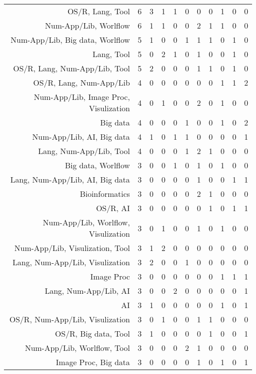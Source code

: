 {\begin{landscape}
\begin{longtable}[htb]{r|c|c|c|c|c|c|c|c|c|c}
{OS/R, Lang, Tool} & 6 & 3 & 1 & 1 & 0 & 0 & 0 & 1 & 0 & 0 \\%
{Num-App/Lib, Worlflow} & 6 & 1 & 1 & 0 & 0 & 2 & 1 & 1 & 0 & 0 \\%
{Num-App/Lib, Big data, Worlflow} & 5 & 1 & 0 & 0 & 1 & 1 & 1 & 0 & 1 & 0 \\%
{Lang, Tool} & 5 & 0 & 2 & 1 & 0 & 1 & 0 & 0 & 1 & 0 \\%
{OS/R, Lang, Num-App/Lib, Tool} & 5 & 2 & 0 & 0 & 0 & 1 & 1 & 0 & 1 & 0 \\%
{OS/R, Lang, Num-App/Lib} & 4 & 0 & 0 & 0 & 0 & 0 & 0 & 1 & 1 & 2 \\%
{Num-App/Lib, Image Proc, Visulization} & 4 & 0 & 1 & 0 & 0 & 2 & 0 & 1 & 0 & 0 \\%
{Big data} & 4 & 0 & 0 & 0 & 1 & 0 & 0 & 1 & 0 & 2 \\%
{Num-App/Lib, AI, Big data} & 4 & 1 & 0 & 1 & 1 & 0 & 0 & 0 & 0 & 1 \\%
{Lang, Num-App/Lib, Tool} & 4 & 0 & 0 & 0 & 1 & 2 & 1 & 0 & 0 & 0 \\%
{Big data, Worlflow} & 3 & 0 & 0 & 1 & 0 & 1 & 0 & 1 & 0 & 0 \\%
{Lang, Num-App/Lib, AI, Big data} & 3 & 0 & 0 & 0 & 0 & 1 & 0 & 0 & 1 & 1 \\%
{Bioinformatics} & 3 & 0 & 0 & 0 & 0 & 2 & 1 & 0 & 0 & 0 \\%
{OS/R, AI} & 3 & 0 & 0 & 0 & 0 & 0 & 1 & 0 & 1 & 1 \\%
{Num-App/Lib, Worlflow, Visulization} & 3 & 0 & 1 & 0 & 0 & 1 & 0 & 1 & 0 & 0 \\%
{Num-App/Lib, Visulization, Tool} & 3 & 1 & 2 & 0 & 0 & 0 & 0 & 0 & 0 & 0 \\%
{Lang, Num-App/Lib, Visulization} & 3 & 2 & 0 & 0 & 1 & 0 & 0 & 0 & 0 & 0 \\%
{Image Proc} & 3 & 0 & 0 & 0 & 0 & 0 & 0 & 1 & 1 & 1 \\%
{Lang, Num-App/Lib, AI} & 3 & 0 & 0 & 2 & 0 & 0 & 0 & 0 & 0 & 1 \\%
{AI} & 3 & 1 & 0 & 0 & 0 & 0 & 0 & 1 & 0 & 1 \\%
{OS/R, Num-App/Lib, Visulization} & 3 & 0 & 1 & 0 & 0 & 1 & 1 & 0 & 0 & 0 \\%
{OS/R, Big data, Tool} & 3 & 1 & 0 & 0 & 0 & 0 & 1 & 0 & 0 & 1 \\%
{Num-App/Lib, Worlflow, Tool} & 3 & 0 & 0 & 0 & 2 & 1 & 0 & 0 & 0 & 0 \\%
{Image Proc, Big data} & 3 & 0 & 0 & 0 & 0 & 1 & 0 & 1 & 0 & 1 \\%

\end{longtable}
\end{landscape}}
